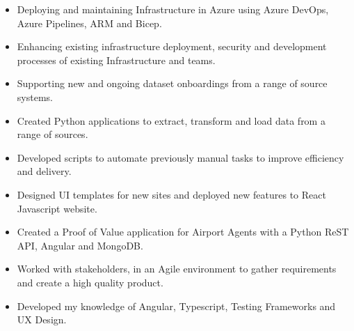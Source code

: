\documentclass[10pt,a4paper,ragged2e]{maltacv}
\begin{document}


\makecvheader


\begin{itemize}
  \item Deploying and maintaining Infrastructure in Azure using Azure DevOps, Azure Pipelines, ARM and Bicep.
  \item Enhancing existing infrastructure deployment, security and development processes of existing Infrastructure and teams.
  \item Supporting new and ongoing dataset onboardings from a range of source systems.
\end{itemize}

\divider

\begin{itemize}
  \item Created Python applications to extract, transform and load data from a range of sources.
  \item Developed scripts to automate previously manual tasks to improve efficiency and delivery.
  \item Designed UI templates for new sites and deployed new features to React Javascript website.
\end{itemize}

\divider

\begin{itemize}
  \item Created a Proof of Value application for Airport Agents with a Python ReST API, Angular and MongoDB.
  \item Worked with stakeholders, in an Agile environment to gather requirements and create a high quality product.
  \item Developed my knowledge of Angular, Typescript, Testing Frameworks and UX Design.
\end{itemize}
\end{document}
